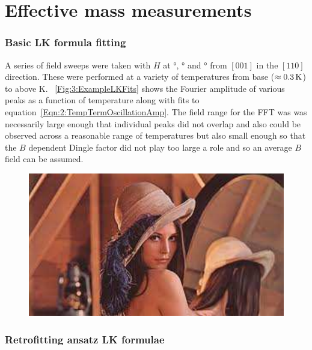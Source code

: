 
\section{Effective mass measurements}


\subsubsection{Basic LK formula fitting}

A series of field sweeps were taken with $H$ at \unit[12]{\degree}, \unit[28]{\degree} and \unit[46]{\degree} from $[001]$ in the $[110]$ direction. These were performed at a variety of temperatures from base ($\approx\unit[0.3]{K}$) to above \unit[2]{K}. \Fig~\ref{Fig:3:ExampleLKFits} shows the Fourier amplitude of various peaks as a function of temperature along with fits to equation~\ref{Eqn:2:TempTermOscillationAmp}. The field range for the FFT was was necessarily large enough that individual peaks did not overlap and also could be observed across a reasonable range of temperatures but also small enough so that the $B$ dependent Dingle factor did not play too large a role and so an average $B$ field can be assumed.

\begin{figure}[h!]
    \begin{center}
        \includegraphics[scale=0.7]{Misc/TODO}
        \caption{}
        \label{Fig:3:SimpleLKFits}
    \end{center}
\end{figure}

\subsubsection{Retrofitting ansatz LK formulae}

